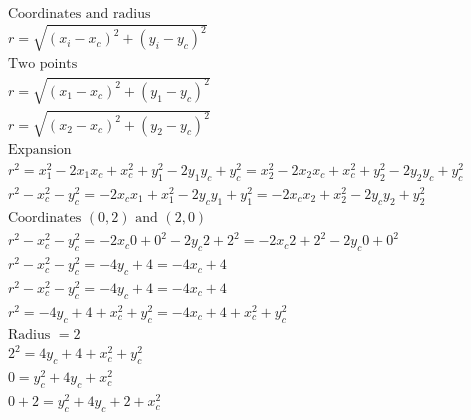 \begin{align}
\text{Coordinates and radius} \\
r = \sqrt{(x_{i} - x_{c}) ^ 2 + (y_{i} - y_{c}) ^ 2} \\

\text{Two points} \\
r = \sqrt{(x_{1} - x_{c}) ^ 2 + (y_{1} - y_{c}) ^ 2} \\
r = \sqrt{(x_{2} - x_{c}) ^ 2 + (y_{2} - y_{c}) ^ 2} \\

\text{Expansion}\\
r^2 = x_{1} ^ 2 - 2x_{1}x_{c} + x_{c} ^ 2 +  y_{1} ^ 2 - 2y_{1}y_{c} + y_{c} ^ 2 = x_{2} ^ 2 - 2x_{2}x_{c} + x_{c} ^ 2 +  y_{2} ^ 2 - 2y_{2}y_{c} + y_{c} ^ 2\\
r^2 - x_{c} ^ 2 - y_{c} ^ 2 = - 2x_{c}x_{1} + x_{1} ^ 2 - 2y_{c}y_{1} + y_{1} ^ 2 = - 2x_{c}x_{2} + x_{2} ^ 2 - 2y_{c}y_{2} + y_{2} ^ 2\\

\text{Coordinates } (0, 2) \text{ and } (2, 0)\\
r^2 - x_{c} ^ 2 - y_{c} ^ 2 = - 2x_{c}0 + 0 ^ 2 - 2y_{c}2 + 2 ^ 2 = - 2x_{c}2 + 2 ^ 2 - 2y_{c}0 + 0 ^ 2\\
r^2 - x_{c} ^ 2 - y_{c} ^ 2 = - 4y_{c} + 4 = - 4x_{c} + 4\\
r^2 - x_{c} ^ 2 - y_{c} ^ 2 = - 4y_{c} + 4 = - 4x_{c} + 4\\
r^2 = - 4y_{c} + 4 +  x_{c} ^ 2 + y_{c} ^ 2  = - 4x_{c} + 4 +  x_{c} ^ 2 + y_{c} ^ 2\\

\text{Radius } = 2\\
2^2 = 4y_{c} + 4 +  x_{c} ^ 2 + y_{c} ^ 2\\
0 = y_{c} ^ 2 + 4y_{c} +  x_{c} ^ 2\\
0 + 2 =  y_{c} ^ 2 + 4y_{c} + 2 + x_{c} ^ 2
\end{align}
